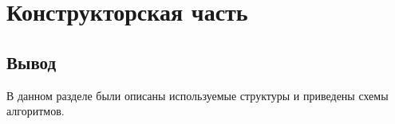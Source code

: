 \chapter{Конструкторская часть}


\section*{\hsp Вывод}
В данном разделе были описаны используемые структуры и приведены схемы алгоритмов.